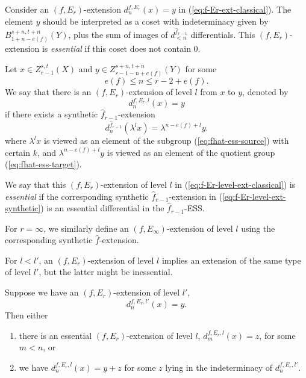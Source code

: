 \begin{remark} \label{def:fErextess}
Consider an $(f,E_r)$-extension $d_{n}^{f,E_r}(x)=y$ in (\ref{eq:f-Er-ext-classical}).
    The element $y$ should be interpreted as a coset with indeterminacy given by $B_{1+n-e(f)}^{s+n,t+n}(Y)$, plus the sum of images of $d^{\hat f_{r-1}}_{<n}$ differentials.   This $(f,E_r)$-extension is \emph{essential} if this coset does not contain 0.
\end{remark}

\begin{definition}\label{def:f-Er-level-extension}
    Let $x\in Z^{s,t}_{r-1}(X)$ and $y\in Z^{s+n,t+n}_{r-1-n+e(f)}(Y)$ for some
    $$e(f)\le n\le r-2+e(f).$$
    We say that there is an $(f,E_r)$-extension of level $l$ from $x$ to $y$, denoted by
    \begin{equation}\label{eq:f-Er-level-ext-classical}
    d_{n}^{f,E_r,l}(x)=y
    \end{equation}
    if there exists a synthetic $\hat f_{r-1}$-extension
    \begin{equation}\label{eq:f-Er-level-ext-synthetic}
        d_{n}^{\hat f_{r-1}}(\lambda^l x)=\lambda^{n-e(f)+l} y.
    \end{equation}
    where $\lambda^l x$ is viewed as an element of the subgroup (\ref{eq:fhat-ess-source}) with certain $k$, and $\lambda^{n-e(f)+l} y$ is viewed as an element of the quotient group (\ref{eq:fhat-ess-target}).

    We say that this $(f,E_r)$-extension of level $l$ in (\ref{eq:f-Er-level-ext-classical}) is \emph{essential} if the corresponding synthetic $\hat f_{r-1}$-extension in (\ref{eq:f-Er-level-ext-synthetic}) is an essential differential in the $\hat f_{r-1}$-ESS.

    For $r=\infty$, we similarly define an $(f,E_\infty)$-extension of level $l$ using the corresponding synthetic $\hat f$-extension.
\end{definition}

For $l < l'$, an $(f,E_r)$-extension of level $l$ implies an extension of the same type of level $l'$, but the latter might be inessential.

\begin{proposition}\label{prop:level-comparison}
    Suppose we have an $(f,E_r)$-extension of level $l'$,
    $$d_n^{f,E_r,l'}(x) = y.$$
    Then either
    \begin{enumerate}
        \item there is an essential $(f,E_r)$-extension of level $l$, $d_m^{f,E_r,l}(x) = z$, for some $m < n$, or
        \item we have $d_n^{f,E_r,l}(x) = y + z$ for some $z$ lying in the indeterminacy of $d_n^{f,E_r,l'}$.
    \end{enumerate}
\end{proposition}

